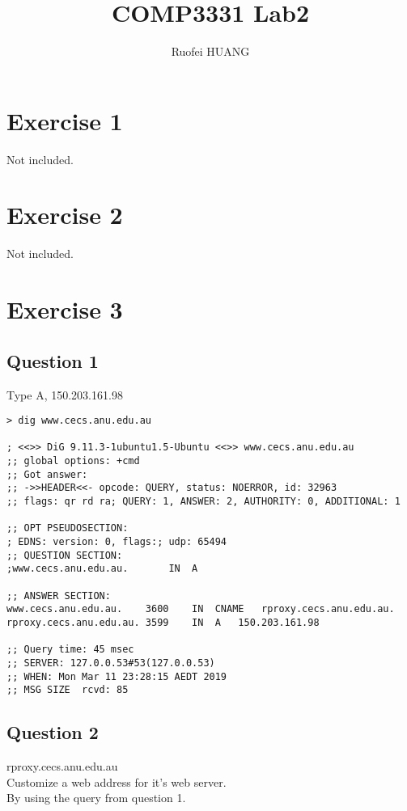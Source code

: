 \documentclass{article}
\begin{document}
\title{COMP3331 Lab2}
\author{Ruofei HUANG}

\maketitle

\section{Exercise 1}
Not included.

\section{Exercise 2}
Not included.

\section{Exercise 3}

\subsection{Question 1}

Type A, 150.203.161.98

\begin{lstlisting}
> dig www.cecs.anu.edu.au

; <<>> DiG 9.11.3-1ubuntu1.5-Ubuntu <<>> www.cecs.anu.edu.au
;; global options: +cmd
;; Got answer:
;; ->>HEADER<<- opcode: QUERY, status: NOERROR, id: 32963
;; flags: qr rd ra; QUERY: 1, ANSWER: 2, AUTHORITY: 0, ADDITIONAL: 1

;; OPT PSEUDOSECTION:
; EDNS: version: 0, flags:; udp: 65494
;; QUESTION SECTION:
;www.cecs.anu.edu.au.		IN	A

;; ANSWER SECTION:
www.cecs.anu.edu.au.	3600	IN	CNAME	rproxy.cecs.anu.edu.au.
rproxy.cecs.anu.edu.au.	3599	IN	A	150.203.161.98

;; Query time: 45 msec
;; SERVER: 127.0.0.53#53(127.0.0.53)
;; WHEN: Mon Mar 11 23:28:15 AEDT 2019
;; MSG SIZE  rcvd: 85
\end{lstlisting}

\subsection{Question 2}

rproxy.cecs.anu.edu.au \\
Customize a web address for it's web server.
\\ By using the query from question 1.
\end{document}
